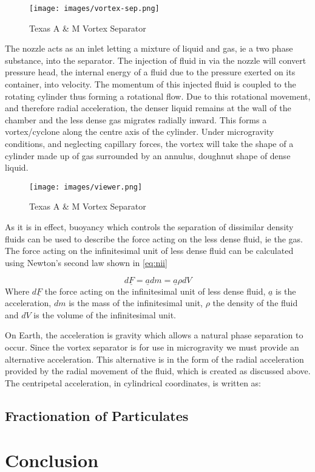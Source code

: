 \documentclass[12pt]{article}
\begin{document}
\begin{figure}[ht]
\centering
\texttt{[image: images/vortex-sep.png]}
\label{fig:vortex}
\caption{Texas A \& M Vortex Separator}
\end{figure}

The nozzle acts as an inlet letting a mixture of liquid and gas, ie a two phase substance, into the separator. The injection of fluid in via the nozzle will convert pressure head, the internal energy of a fluid due to the pressure exerted on its container, into velocity. The momentum of this injected fluid is coupled to the rotating cylinder thus forming a rotational flow. Due to this rotational movement, and therefore radial acceleration, the denser liquid remains at the wall of the chamber and the less dense gas migrates radially inward.\cite{} This forms a vortex/cyclone along the centre axis of the cylinder. Under microgravity conditions, and neglecting capillary forces, the vortex will take the shape of a cylinder made up of gas surrounded by an annulus, doughnut shape of dense liquid.

\begin{figure}[ht1]
\centering
\texttt{[image: images/viewer.png]}
\label{fig:vortex}
\caption{Texas A \& M Vortex Separator}
\end{figure}

As it is in effect, buoyancy which controls the separation of dissimilar density fluids can be used to describe the force acting on the less dense fluid, ie the gas. The force acting on the infinitesimal unit of less dense fluid can be calculated using Newton’s second law shown in \cref{eq:nii}

\begin{equation}
d\underline{F}=\underline{a}dm=\underline{a}\rho dV
\label{eq:nii}
\end{equation}
Where $d\underline{F}$ the force acting on the infinitesimal unit of less dense fluid, $\underline{a}$ is the acceleration, $dm$ is the mass of the infinitesimal unit, $\rho$ the density of the fluid and $dV$ is the volume of the infinitesimal unit.


On Earth, the acceleration is gravity which allows a natural phase separation to occur. Since the vortex separator is for use in microgravity we must provide an alternative acceleration. This alternative is in the form of the radial acceleration provided by the radial movement of the fluid, which is created as discussed above. The centripetal acceleration, in cylindrical coordinates, is written as:

\subsection{Fractionation of Particulates}
\section{Conclusion}



\end{document}
